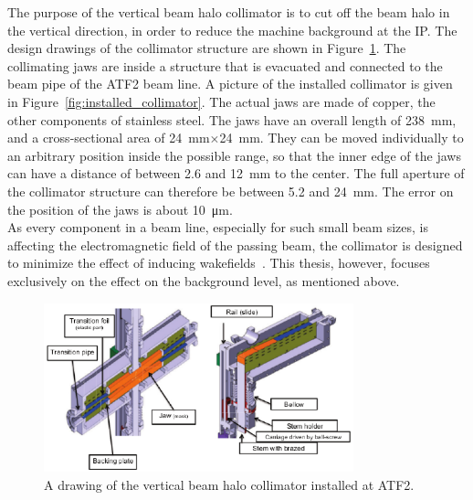 The purpose of the vertical beam halo collimator is to cut off the beam halo in the vertical direction, in order to reduce the machine background at the IP.
The design drawings of the collimator structure are shown in Figure~\ref{fig:collimator}.
The collimating jaws are inside a structure that is evacuated and connected to the beam pipe of the ATF2 beam line. 
A picture of the installed collimator is given in Figure~\ref{fig:installed_collimator}.
The actual jaws are made of copper, the other components of stainless steel. 
The jaws have an overall length of \SI{238}{\milli\meter}, and a cross-sectional area of \mbox{\SI{24}{\milli\meter}$\times$\SI{24}{\milli\meter}}.
They can be moved individually to an arbitrary position inside the possible range, so that the inner edge of the jaws can have a distance of between 2.6 and \SI{12}{\milli\metre} to the center. 
The full aperture of the collimator structure can therefore be between 5.2 and \SI{24}{\milli\metre}. 
The error on the position of the jaws is about \SI{10}{\micro\metre}.\\
As every component in a beam line, especially for such small beam sizes, is affecting the electromagnetic field of the passing beam, the collimator is designed to minimize the effect of inducing wakefields~\cite{NuriaCollimator2015,Nuria_Thesis}. 
This thesis, however, focuses exclusively on the effect on the background level, as mentioned above.
\begin{figure}
\centering
\includegraphics[width=0.8\textwidth]{Figures/ATF/ATF2_beamhalo_collimator.pdf}
\caption[Drawing of the beam halo collimator]{A drawing of the vertical beam halo collimator installed at ATF2.~\cite{NuriaCollimator2015}}
\label{fig:collimator}
\end{figure}
